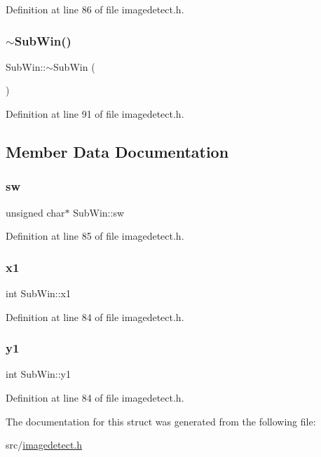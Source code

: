 Definition at line 86 of file imagedetect.\+h.

\mbox{\label{struct_sub_win_a0109060baef32fe3bce2d5d7a0bb14ad}} 
\subsubsection{\texorpdfstring{$\sim$SubWin()}{~SubWin()}}
{\footnotesize\ttfamily Sub\+Win\+::$\sim$\+Sub\+Win (\begin{DoxyParamCaption}{ }\end{DoxyParamCaption})\hspace{0.3cm}{\ttfamily [inline]}}



Definition at line 91 of file imagedetect.\+h.



\subsection{Member Data Documentation}
\mbox{\label{struct_sub_win_afc0729b8c7adcf1084b336fc9c06d17a}} 
\subsubsection{\texorpdfstring{sw}{sw}}
{\footnotesize\ttfamily unsigned char$\ast$ Sub\+Win\+::sw}



Definition at line 85 of file imagedetect.\+h.

\mbox{\label{struct_sub_win_a9d3d7d63aafe49c4387ffff1654c842d}} 
\subsubsection{\texorpdfstring{x1}{x1}}
{\footnotesize\ttfamily int Sub\+Win\+::x1}



Definition at line 84 of file imagedetect.\+h.

\mbox{\label{struct_sub_win_a46ae68245f168b20f7a0c1c16ad6902a}} 
\subsubsection{\texorpdfstring{y1}{y1}}
{\footnotesize\ttfamily int Sub\+Win\+::y1}



Definition at line 84 of file imagedetect.\+h.



The documentation for this struct was generated from the following file\+:\begin{DoxyCompactItemize}
\item 
src/\mbox{\hyperlink{imagedetect_8h}{imagedetect.\+h}}\end{DoxyCompactItemize}

